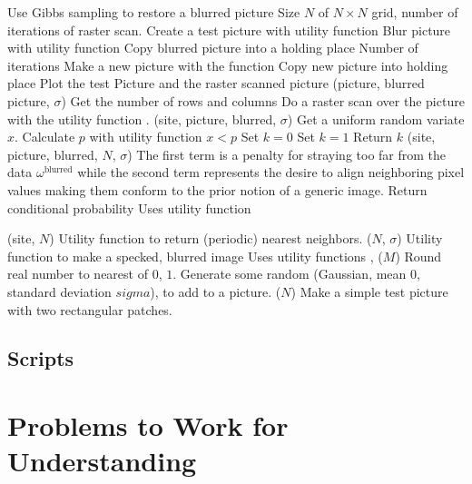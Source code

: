 \documentclass[12pt]{article}
\begin{document}
\begin{codebox}
\li  \Comment Use Gibbs sampling to restore a blurred picture
\li  {} Size $N$ of $N \times N$ grid, number of iterations of
    raster scan.
\li   Create a test picture with utility function  
\li   Blur picture with utility function 
\li   Copy blurred picture into a holding place
\li  \For Number of iterations
\li    Make a new picture with the  function
\li   Copy new picture into holding place
\li  \End
\li   Plot the test Picture and the raster scanned picture
\zi
\li  {}(picture, blurred picture, $\sigma$)
\li   Get the number of rows and columns
\li   Do a raster scan over the picture with the utility function .
\zi
\li  {}(site, picture, blurred, $\sigma$)
\li   Get a uniform random variate $x$.
\li   Calculate $p$ with utility function 
\li  \If  $x < p$
\li   Set $k = 0$
\li  \Else
\li   Set $k = 1$
\li  \End
\li   Return $k$
\zi
\li  {}(site, picture, blurred, $N$, $\sigma$)
\li   The first term is a penalty for
 straying too far from the data \( \omega^{\text{blurred}} \) while the
second term represents the desire to align neighboring pixel values
making them conform to the prior notion of a generic image.
\li  Return conditional probability
\li Uses utility function 

\li{}(site, $N$)
\li Utility function to return (periodic) nearest neighbors.
\zi
\li{}($N$, $\sigma$)
\li Utility function to make a specked, blurred image
\li\Comment Uses utility functions , 
\zi
\li{}($M$)
\li Round real number to nearest of $0$, $1$.
\zi
\li{}
\li Generate some random (Gaussian, mean $0$, standard deviation
\li$sigma$), to add to a picture.
\zi
\li{}($N$)
\li Make a simple test picture with two rectangular patches.
\end{codebox}

\subsection*{Scripts}



\hr

\section*{Problems to Work for Understanding}
\end{document}
